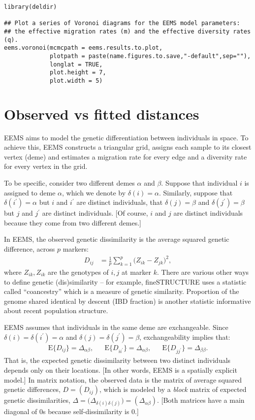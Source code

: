 \documentclass[a4paper,10pt,DIV=15,titlepage,mpinclude=true]{scrartcl}
\newcommand{\specialrm}[1]{\mathrm{#1}}
\providecommand{\E}{\specialrm{E}}
\begin{document}
\begin{lstlisting}[style=Rcode]
library(deldir)

## Plot a series of Voronoi diagrams for the EEMS model parameters:          
## the effective migration rates (m) and the effective diversity rates (q).
eems.voronoi(mcmcpath = eems.results.to.plot,
             plotpath = paste(name.figures.to.save,"-default",sep=""),
             longlat = TRUE,
             plot.height = 7,
             plot.width = 5)
\end{lstlisting}

\newpage 

\section{Observed vs fitted distances} \label{sec:obsr-vs-fitted-dist}

EEMS aims to model the genetic differentiation between individuals in space. To achieve this, EEMS constructs a triangular grid, assigns each sample to its closest vertex (deme) and estimates a migration rate for every edge and a diversity rate for every vertex in the grid.

To be specific, consider two different demes $\alpha$ and $\beta$. Suppose that individual $i$ is assigned to deme $\alpha$, which we denote by $\delta(i) = \alpha$. Similarly, suppose that $\delta(i^\prime) = \alpha$ but $i$ and $i^\prime$ are distinct individuals, that $\delta(j) = \beta$ and $\delta(j^\prime) = \beta$ but $j$ and $j^\prime$ are distinct individuals. [Of course, $i$ and $j$ are distinct individuals because they come from two different demes.]

In EEMS, the observed genetic dissimilarity is the average squared genetic difference, across $p$ markers:
\begin{align}
D_{ij}&=\frac{1}{p}\sum_{k=1}^p\big(Z_{ik}-Z_{jk}\big)^2,
\end{align}
where $Z_{ik},Z_{ik}$ are the genotypes of $i,j$ at marker $k$. There are various other ways to define genetic (dis)similarity -- for example, fineSTRUCTURE uses a statistic called ``coancestry'' which is a measure of genetic similarity. Proportion of the genome shared identical by descent (IBD fraction) is another statistic informative about recent population structure.

EEMS assumes that individuals in the same deme are exchangeable. Since $\delta(i) = \delta(i^\prime) = \alpha$ and $\delta(j) = \delta(j^\prime) = \beta$, exchangeability implies that:
\begin{align}
\E\big\{D_{ij}\big\} = \Delta_{\alpha\beta},&&
\E\big\{D_{ii^\prime}\big\} = \Delta_{\alpha\beta},&&
\E\big\{D_{jj^\prime}\big\} = \Delta_{\beta\beta}.
\end{align}
That is, the expected genetic dissimilarity between two distinct individuals depends only on their locations. [In other words, EEMS is a spatially explicit model.] In matrix notation, the observed data is the matrix of average squared genetic differences, $D=(D_{ij})$, which is modeled by a \textit{block} matrix of expected genetic dissimilarities, $\Delta=\big(\Delta_{\delta(i)\delta(j)}\big)=(\Delta_{\alpha\beta})$. [Both matrices have a main diagonal of 0s because self-dissimilarity is 0.]
\end{document}
